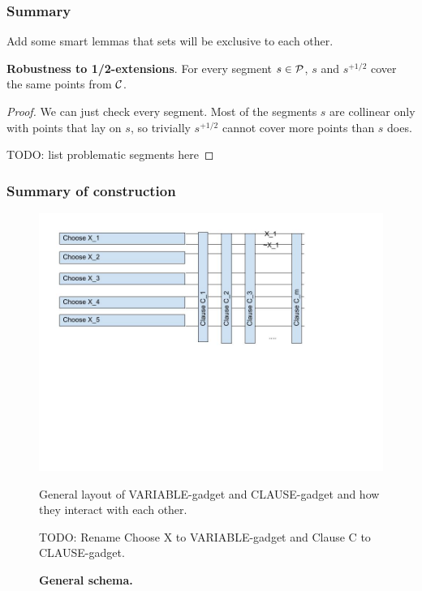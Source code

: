 \subsubsection{Summary}

Add some smart lemmas that sets will be exclusive to each other.

\begin{lemma}
\textbf{Robustness to 1/2-extensions}. For every segment $s \in \mathcal{P}$,
$s$ and $s^{+1/2}$ cover the same points from $\mathcal{C}$.
\end{lemma}

\begin{proof}
We can just check every segment. Most of the segments $s$
are collinear only with points that lay on $s$,
so trivially $s^{+1/2}$ cannot cover more points than $s$ does.

TODO: list problematic segments here
\end{proof}


\subsubsection{Summary of construction}

\begin{figure}
\centering
\includegraphics[width=\linewidth]{segment_apx_sketch.jpg}
\caption{\textbf{General schema.}}
General layout of VARIABLE-gadget and CLAUSE-gadget and how they
interact with each other.

TODO: Rename Choose X to VARIABLE-gadget and Clause C to CLAUSE-gadget.
\label{fig:segment_apx_sketch}
\end{figure}

